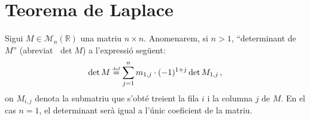 
\newcommand{\bl}{\color{blue}}
\newcommand{\rd}{\color{red}}
\newcommand{\gre}{\color{ForestGreen}}

\newcommand{\ucarr}{\mathbin{\text{\rotatebox[origin=c]{270}{$\curvearrowleft$}}}}
\newcommand{\dcarr}{\mathbin{\text{\rotatebox[origin=c]{270}{$\curvearrowright$}}}}

\section{Teorema de Laplace}

\begin{defi*}[Determinant]
	Sigui $M \in \mathcal{M}_n(\mathbb{R})$ una matriu $n\times n$. Anomenarem, si $n>1$, ``determinant de $M$'' (abreviat $\; \det M$) a l'expressió següent: \[\det M \stackrel{\text{\tiny def}}{=} \sum_{j=1}^{n} m_{1,j}\cdot(-1)^{1+j}\det M_{1,j}  \,,\] on $M_{i,j}$ denota la submatriu que s'obté treient la fila $i$ i la columna $j$ de $M$. En el cas $n=1$, el determinant serà igual a l'únic coeficient de la matriu.
\end{defi*}

\vspace{1cm}

